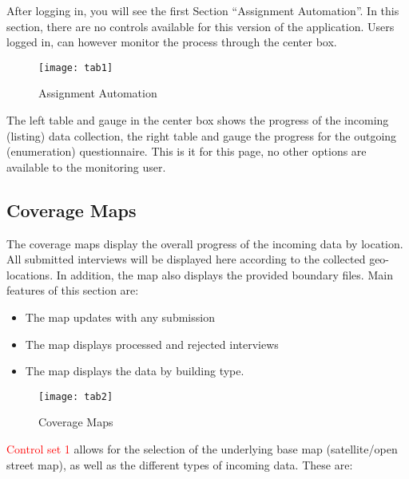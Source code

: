 \documentclass[a4paper]{article}
\providecommand{\tightlist}{%
  \setlength{\itemsep}{0pt}\setlength{\parskip}{0pt}}
\begin{document}
After logging in, you will see the first Section ``Assignment Automation''. In this section, there are no controls available for this version of the application. Users logged in, can however monitor the process through the center box.

\begin{figure}

{\centering \texttt{[image: tab1]} 

}

\caption{Assignment Automation}\label{fig:tab1}
\end{figure}

The left table and gauge in the center box shows the progress of the incoming (listing) data collection, the right table and gauge the progress for the outgoing (enumeration) questionnaire. This is it for this page, no other options are available to the monitoring user.

\newpage

\hypertarget{coverage-maps}{%
\subsection{Coverage Maps}\label{coverage-maps}}

The coverage maps display the overall progress of the incoming data by location. All submitted interviews will be displayed here according to the collected geo-locations. In addition, the map also displays the provided boundary files. Main features of this section are:

\begin{itemize}
\tightlist
\item
  The map updates with any submission
\item
  The map displays processed and rejected interviews
\item
  The map displays the data by building type.
\end{itemize}

\begin{figure}

{\centering \texttt{[image: tab2]} 

}

\caption{Coverage Maps}\label{fig:tab2}
\end{figure}

\textcolor{red}{Control set 1} allows for the selection of the underlying base map (satellite/open street map), as well as the different types of incoming data. These are:
\end{document}
